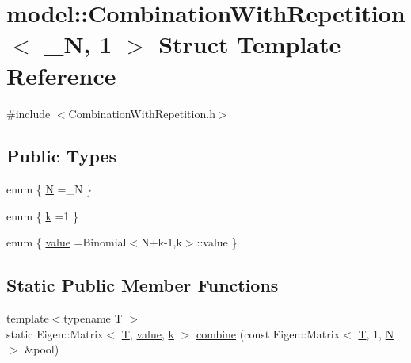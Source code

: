 \hypertarget{structmodel_1_1_combination_with_repetition_3_01___n_00_011_01_4}{}\section{model\+:\+:Combination\+With\+Repetition$<$ \+\_\+\+N, 1 $>$ Struct Template Reference}
\label{structmodel_1_1_combination_with_repetition_3_01___n_00_011_01_4}


{\ttfamily \#include $<$Combination\+With\+Repetition.\+h$>$}

\subsection*{Public Types}
\begin{DoxyCompactItemize}
\item 
enum \{ \hyperlink{structmodel_1_1_combination_with_repetition_3_01___n_00_011_01_4_a0284171113915fd692564c4e2a06c224af9de3f0e731d70a89b4012809014006a}{N} =\+\_\+\+N
 \}
\item 
enum \{ \hyperlink{structmodel_1_1_combination_with_repetition_3_01___n_00_011_01_4_a9ee120688ab863670f74438af94240a7a36e353bf9ca3d63d0e0969ad79ef1713}{k} =1
 \}
\item 
enum \{ \hyperlink{structmodel_1_1_combination_with_repetition_3_01___n_00_011_01_4_ab4f17c0709ac3411f75f3d1977999bfaa548237296c5e4bcd528f9ade2ea0f532}{value} =Binomial$<$N+k-\/1,k$>$\+:\+:value
 \}
\end{DoxyCompactItemize}
\subsection*{Static Public Member Functions}
\begin{DoxyCompactItemize}
\item 
{\footnotesize template$<$typename T $>$ }\\static Eigen\+::\+Matrix$<$ \hyperlink{_spline_node_base__corder1_8h_a82692d3a5502b91460591f1d5504314a}{T}, \hyperlink{structmodel_1_1_combination_with_repetition_3_01___n_00_011_01_4_ab4f17c0709ac3411f75f3d1977999bfaa548237296c5e4bcd528f9ade2ea0f532}{value}, \hyperlink{structmodel_1_1_combination_with_repetition_3_01___n_00_011_01_4_a9ee120688ab863670f74438af94240a7a36e353bf9ca3d63d0e0969ad79ef1713}{k} $>$ \hyperlink{structmodel_1_1_combination_with_repetition_3_01___n_00_011_01_4_a648d3a3da5042dfcc1bc31867dd37916}{combine} (const Eigen\+::\+Matrix$<$ \hyperlink{_spline_node_base__corder1_8h_a82692d3a5502b91460591f1d5504314a}{T}, 1, \hyperlink{structmodel_1_1_combination_with_repetition_3_01___n_00_011_01_4_a0284171113915fd692564c4e2a06c224af9de3f0e731d70a89b4012809014006a}{N} $>$ \&pool)
\end{DoxyCompactItemize}


